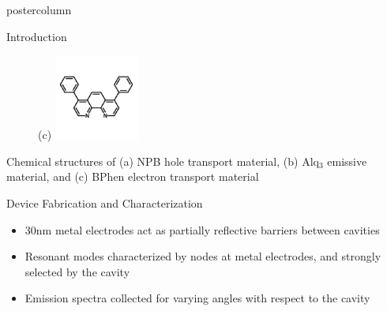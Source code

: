 \documentclass[10pt,papersize={24in,36in}]{beamer}
\begin{document}
\begin{frame}
\begin{columns}
\begin{column}{.49\textwidth}
\begin{beamercolorbox}[center,wd=\textwidth]{postercolumn}
\begin{minipage}[T]{.95\textwidth}
{\begin{block}{Introduction}
\begin{figure}
                    (c) \includegraphics[width=0.25\textwidth]{images/bphen_structure.jpg}
                \end{figure}
                \centering
                \small Chemical structures of (a) NPB hole transport material, (b) Alq$_3$ emissive material, and (c) BPhen electron transport material
            \end{block}
            \vfill
            \begin{block}{Device Fabrication and Characterization}
                \begin{minipage}{0.45\textwidth}
					\begin{itemize}
                     \item 30nm metal electrodes act as partially reflective barriers between cavities
                     \item Resonant modes characterized by nodes at metal electrodes, and strongly selected by the cavity
                     \item Emission spectra collected for varying angles with respect to the cavity
					\end{itemize}
                \end{minipage}
                \begin{minipage}{0.45\textwidth}
                    \centering

\end{minipage}
\end{block}}
\end{minipage}
\end{beamercolorbox}
\end{column}
\end{columns}
\end{frame}
\end{document}
